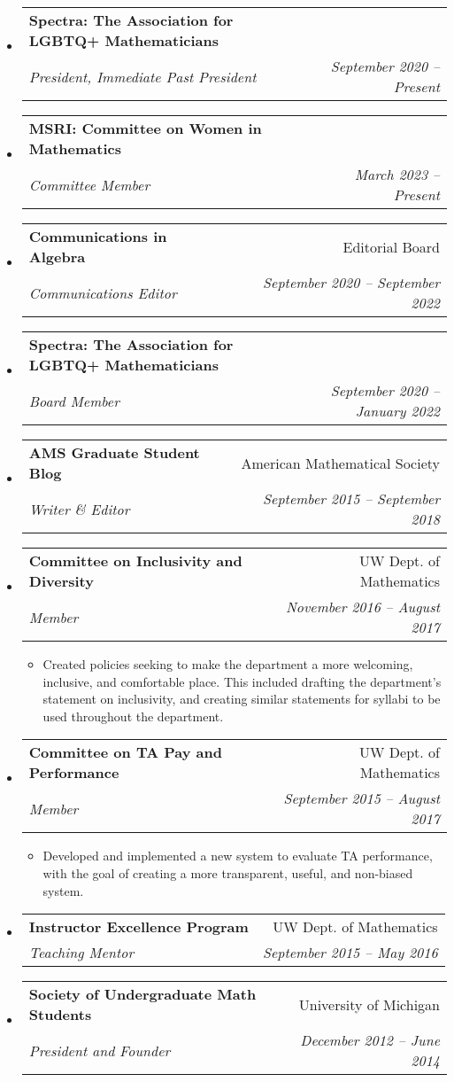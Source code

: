 \documentclass[letterpaper,11pt]{article}
\makeatletter
\newcommand{\resitem}[1]{\item #1 \vspace{-2pt}}
\newcommand{\ressubheading}[4]{
\begin{tabular*}{6.5in}[t]{l@{\cftdotfill{\cftsecdotsep}\extracolsep{\fill}}r}
		\textbf{#1} & #2 \\
		\textit{#3} & \textit{#4} \\
\end{tabular*}\vspace{-6pt}}
\makeatother
\begin{document}
\begin{itemize}
\item 
	\ressubheading{Spectra: The Association for LGBTQ+ Mathematicians }{}{President, Immediate Past President}{September 2020 -- Present}

\item 
	\ressubheading{MSRI: Committee on Women in Mathematics }{}{Committee Member}{March 2023 -- Present}
	
		
\item 
	\ressubheading{Communications in Algebra }{Editorial Board}{Communications Editor}{September 2020 -- September 2022}
	
\item 
	\ressubheading{Spectra: The Association for LGBTQ+ Mathematicians }{}{Board Member}{September 2020 -- January 2022}
	
\item 
	\ressubheading{AMS Graduate Student Blog}{American Mathematical Society}{Writer \& Editor}{September 2015 -- September 2018}
	

\item 
	\ressubheading{Committee on Inclusivity and Diversity}{UW Dept. of Mathematics}{Member}{November 2016 -- August 2017}
	\begin{itemize}
		\resitem{Created policies seeking to make the department a more welcoming, inclusive, and comfortable place. This included drafting the department's statement on inclusivity, and creating similar statements for syllabi to be used throughout the department.}
	\end{itemize}

\item 
	\ressubheading{Committee on TA Pay and Performance}{UW Dept. of Mathematics}{Member}{September 2015 -- August 2017}
	\begin{itemize}
		\resitem{Developed and implemented a new system to evaluate TA performance, with the goal of creating a more transparent, useful, and non-biased system.}
	\end{itemize}
	
\item 
	\ressubheading{Instructor Excellence Program}{UW Dept. of Mathematics}{Teaching Mentor}{September 2015 -- May 2016}

\item 
	\ressubheading{Society of Undergraduate Math Students}{University of Michigan}{President and Founder}{December 2012 -- June 2014}

\end{itemize}
\end{document}
